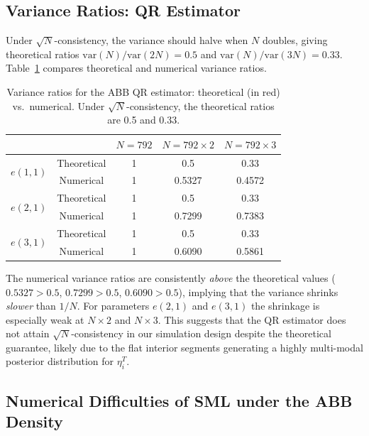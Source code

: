 \documentclass[12pt]{article}
\begin{document}
\subsection{Variance Ratios: QR Estimator}
\label{ssec:var_qr}

Under $\sqrt{N}$-consistency, the variance should halve when $N$ doubles,
giving theoretical ratios $\text{var}(N)/\text{var}(2N)=0.5$ and
$\text{var}(N)/\text{var}(3N)=0.33$.
Table~\ref{tab:abb_var} compares theoretical and numerical variance ratios.

\begin{table}[H]
\centering
\caption{Variance ratios for the ABB QR estimator:
theoretical (in red) vs.\ numerical.
Under $\sqrt{N}$-consistency, the theoretical ratios are 0.5 and 0.33.}
\label{tab:abb_var}
\begin{tabular}{lcccc}
\toprule
 & & $N=792$ & $N=792\times2$ & $N=792\times3$ \\
\midrule
\multirow{2}{*}{$e(1,1)$}
 & Theoretical & \textcolor{myred}{1} & \textcolor{myred}{0.5} & \textcolor{myred}{0.33} \\
 & Numerical   & 1 & 0.5327 & 0.4572 \\
\midrule
\multirow{2}{*}{$e(2,1)$}
 & Theoretical & \textcolor{myred}{1} & \textcolor{myred}{0.5} & \textcolor{myred}{0.33} \\
 & Numerical   & 1 & 0.7299 & 0.7383 \\
\midrule
\multirow{2}{*}{$e(3,1)$}
 & Theoretical & \textcolor{myred}{1} & \textcolor{myred}{0.5} & \textcolor{myred}{0.33} \\
 & Numerical   & 1 & 0.6090 & 0.5861 \\
\bottomrule
\end{tabular}
\end{table}

\noindent
The numerical variance ratios are consistently \emph{above} the theoretical
values ($0.5327>0.5$, $0.7299>0.5$, $0.6090>0.5$), implying that the
variance shrinks \emph{slower} than $1/N$.
For parameters $e(2,1)$ and $e(3,1)$ the shrinkage is especially weak
at $N\times2$ and $N\times3$.
This suggests that the QR estimator does not attain $\sqrt{N}$-consistency
in our simulation design despite the theoretical guarantee, likely due to the
flat interior segments generating a highly multi-modal posterior distribution
for $\eta_i^T$.

\subsection{Numerical Difficulties of SML under the ABB Density}
\end{document}
